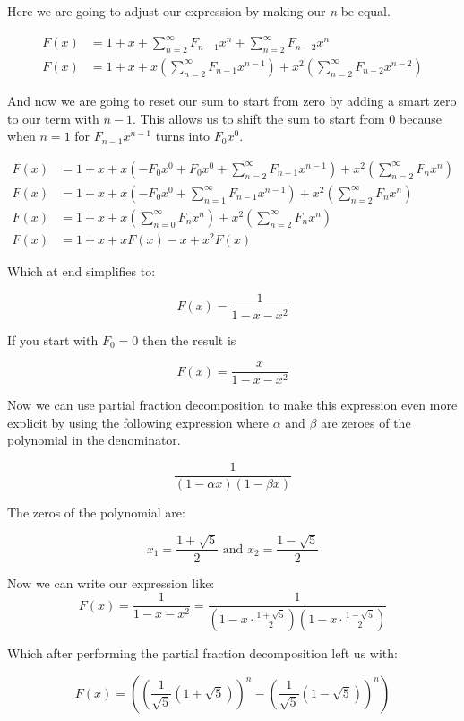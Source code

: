 Here we are going to adjust our expression by making our \emph{n} be equal.

\begin{align*}
    F(x) &= 1 + x + \sum_{n = 2}^{\infty} F_{n -1} x^{n} + \sum_{n = 2}^{\infty} F_{n - 2}x^n \\ 
    F(x) &= 1 + x + x \left( \sum_{n = 2}^{\infty} F_{n -1} x^{n-1}\right) + x^2 \left( \sum_{n = 2}^{\infty} F_{n -2} x^{n-2}\right)
\end{align*}

And now we are going to reset our sum to start from zero by adding a smart zero to our term with 
\(n - 1\). This allows us to shift the sum to start from 0 because when \(n = 1\) for 
\(F_{n - 1}x^{n - 1}\) turns into \(F_0 x^0\).

\begin{align*}
    F(x) &= 1 + x + x \left( -F_{0}x^0 + F_{0}x^0 + \sum_{n = 2}^{\infty} F_{n-1} x^{n-1}\right) + x^2 \left( \sum_{n = 2}^{\infty} F_{n} x^{n}\right)\\
    F(x) &= 1 + x + x \left( -F_{0}x^0 + \sum_{n = 1}^{\infty} F_{n-1} x^{n-1}\right) + x^2 \left( \sum_{n = 2}^{\infty} F_{n} x^{n}\right)\\
    F(x) &= 1 + x + x \left( \sum_{n = 0}^{\infty} F_{n} x^{n}\right) + x^2 \left( \sum_{n = 2}^{\infty} F_{n} x^{n}\right)\\
    F(x) &= 1 + x + x F(x) - x + x^2 F(x)
\end{align*}

Which at end simplifies to:

\[
    F(x) = \frac{1}{1 - x - x^2}
\]

If you start with \(F_0 = 0\) then the result  is

\[
    F(x) = \frac{x}{1 - x - x^2}
\]


Now we can use partial fraction decomposition to make this expression even more explicit
by using the following expression where \(\alpha\) and \(\beta\) are zeroes of the polynomial in the
denominator.

\[
    \frac{1}{\left(1 - \alpha x\right)\left(1 - \beta x\right)}
\]

The zeros of the polynomial are:

\[
    x_1 = \frac{1 + \sqrt{5}}{2} \text{ and }  x_2 = \frac{1 - \sqrt{5}}{2}    
\]


Now we can write our expression like:
\[
    F(x) = \frac{1}{1 - x - x^2} = \frac{1}{\left(1 - x \cdot \frac{1 + \sqrt{5}}{2}\right)\left(1 - x 
    \cdot \frac{1 - \sqrt{5}}{2}\right)}
\]

Which after performing the partial fraction decomposition left us with:

\[
    F(x) = \left( {\left( \frac{1}{\sqrt{5}} (1 + \sqrt{5}) \right)}^n - {\left( \frac{1}{\sqrt{5}} 
    (1 - \sqrt{5}) \right)}^n \right)
\]

\QED


